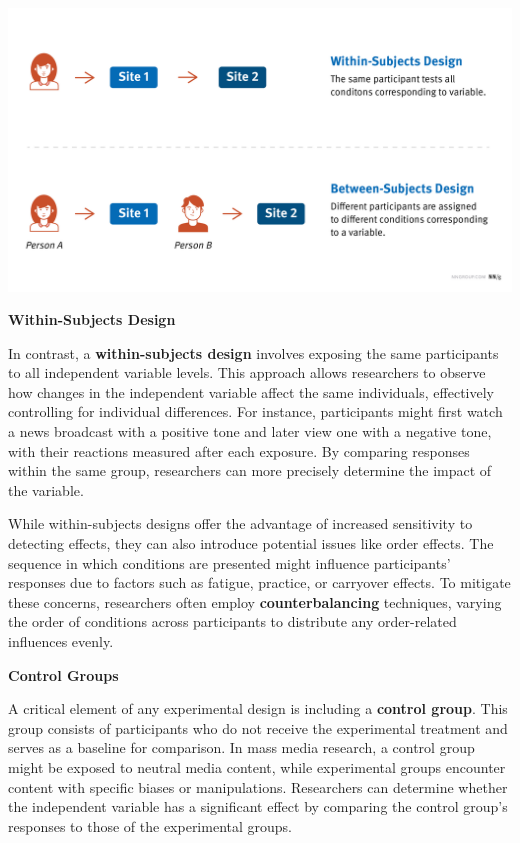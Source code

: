 \documentclass[
]{book}
\begin{document}
\href{https://www.nngroup.com/articles/between-within-subjects/}{\includegraphics[width=1\linewidth,height=\textheight,keepaspectratio]{images/subject-design-graphic.jpg}}

\textbf{Within-Subjects Design}

In contrast, a \textbf{within-subjects design} involves exposing the same participants to all independent variable levels. This approach allows researchers to observe how changes in the independent variable affect the same individuals, effectively controlling for individual differences. For instance, participants might first watch a news broadcast with a positive tone and later view one with a negative tone, with their reactions measured after each exposure. By comparing responses within the same group, researchers can more precisely determine the impact of the variable.

While within-subjects designs offer the advantage of increased sensitivity to detecting effects, they can also introduce potential issues like order effects. The sequence in which conditions are presented might influence participants' responses due to factors such as fatigue, practice, or carryover effects. To mitigate these concerns, researchers often employ \textbf{counterbalancing} techniques, varying the order of conditions across participants to distribute any order-related influences evenly.

\textbf{Control Groups}

A critical element of any experimental design is including a \textbf{control group}. This group consists of participants who do not receive the experimental treatment and serves as a baseline for comparison. In mass media research, a control group might be exposed to neutral media content, while experimental groups encounter content with specific biases or manipulations. Researchers can determine whether the independent variable has a significant effect by comparing the control group's responses to those of the experimental groups.
\end{document}

